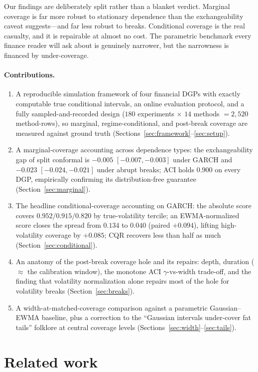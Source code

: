 \documentclass[11pt]{article}
\begin{document}
Our findings are deliberately split rather than a blanket verdict. Marginal
coverage is far more robust to stationary dependence than the exchangeability
caveat suggests---and far less robust to breaks. Conditional coverage is the
real casualty, and it is repairable at almost no cost. The parametric
benchmark every finance reader will ask about is genuinely narrower, but the
narrowness is financed by under-coverage.

\paragraph{Contributions.}
\begin{enumerate}\itemsep2pt
\item A reproducible simulation framework of four financial DGPs with exactly
computable true conditional intervals, an online evaluation protocol, and a
fully sampled-and-recorded design ($180$ experiments $\times$ $14$ methods
$=2{,}520$ method-rows), so marginal, regime-conditional, and post-break
coverage are measured against ground truth (Sections~\ref{sec:framework}--\ref{sec:setup}).
\item A marginal-coverage accounting across dependence types: the
exchangeability gap of split conformal is $-0.005$ $[-0.007,-0.003]$ under
GARCH and $-0.023$ $[-0.024,-0.021]$ under abrupt breaks; ACI holds $0.900$
on every DGP, empirically confirming its distribution-free guarantee
(Section~\ref{sec:marginal}).
\item The headline conditional-coverage accounting on GARCH: the absolute
score covers $0.952/0.915/0.820$ by true-volatility tercile; an EWMA-normalized
score closes the spread from $0.134$ to $0.040$ (paired $+0.094$), lifting
high-volatility coverage by $+0.085$; CQR recovers less than half as much
(Section~\ref{sec:conditional}).
\item An anatomy of the post-break coverage hole and its repairs: depth,
duration ($\approx$ the calibration window), the monotone ACI
$\gamma$-vs-width trade-off, and the finding that volatility normalization
alone repairs most of the hole for volatility breaks
(Section~\ref{sec:breaks}).
\item A width-at-matched-coverage comparison against a parametric
Gaussian--EWMA baseline, plus a correction to the ``Gaussian intervals
under-cover fat tails'' folklore at central coverage levels
(Sections~\ref{sec:width}--\ref{sec:tails}).
\end{enumerate}

\section{Related work}
\label{sec:related}
\end{document}
